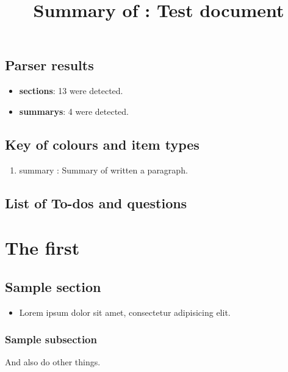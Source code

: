 \title{Summary of : Test document}
\maketitle

\section{Parser results}
    \begin{itemize}[noitemsep]
\item \textbf{sections}: 13 were detected.
\item \textbf{summarys}: 4 were detected.
    \end{itemize}

\section{Key of colours and item types}
    \begin{enumerate}[noitemsep]
        \item summary : Summary of written a paragraph.
    \end{enumerate}

\section{List of To-dos and questions}
\vspace{-36pt}\hspace{11pt}

\chapter{The first}
\label{autosec:0}
\vspace{-36pt}\hspace{11pt}
\section{Sample section}
\label{autosec:1}
    \begin{itemize}[noitemsep]
        \item Lorem ipsum dolor sit amet, consectetur adipisicing elit.
    \end{itemize}
\subsection{Sample subsection}
\label{autosec:2}
And also do other things.
